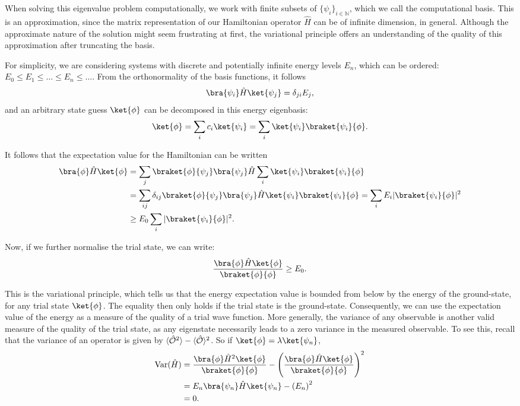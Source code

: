 When solving this eigenvalue problem computationally, we work with finite subsets of $\{\psi_i\}_{i\in \mathbb{N}}$, which we call the computational basis. This is an approximation, since the matrix representation of our Hamiltonian operator $\hat{H}$ can be of infinite dimension, in general. Although the approximate nature of the solution might seem frustrating at first, the variational principle offers an understanding of the quality of this approximation after truncating the basis.

For simplicity, we are considering systems with discrete and potentially infinite energy levels $E_n$, which can be ordered: $E_0 \leq E_1 \leq \dots \leq E_n \leq \dots$. From the orthonormality of the basis functions, it follows 
\begin{align*}
    \bra{\psi_i} \hat{H} \ket{\psi_j} = \delta_{ji} E_j,
\end{align*}
and an arbitrary state guess $\ket{\phi}$ can be decomposed in this energy eigenbasis:
\begin{align*}
    \ket{\phi} = \sum_i c_i\ket{\psi_i}= \sum_i  \ket{\psi_i}\braket{\psi_i}{\phi}. 
\end{align*}

It follows that the expectation value for the Hamiltonian can be written
\begin{align*}
    \bra{\phi} \hat{H}\ket{\phi} &=\sum_j  \braket{\phi}{\psi_j}\bra{\psi_j}  \hat{H}\sum_i  \ket{\psi_i}\braket{\psi_i}{\phi}\\
    &=\sum_{ij}\delta_{ij}\braket{\phi}{\psi_j}\bra{\psi_j}  \hat{H} \ket{\psi_i}\braket{\psi_i}{\phi} = \sum_i E_i \vert \braket{\psi_i}{\phi} \vert ^2\\
    &\geq E_0\sum_i \vert \braket{\psi_i}{\phi} \vert ^2.
\end{align*}

Now, if we further normalise the trial state, we can write:
\begin{align*}
    \frac{\bra{\phi} \hat{H}\ket{\phi}}{\braket{\phi}{\phi}} \geq E_0.
\end{align*}

This is the variational principle, which tells us that the energy expectation value is bounded from below by the energy of the ground-state, for any trial state $\ket{\phi}$. The equality then only holds if the trial state is the ground-state. Consequently, we can use the expectation value of the energy as a measure of the quality of a trial wave function. More generally, the variance of any observable is another valid measure of the quality of the trial state, as any eigenstate necessarily leads to a zero variance in the measured observable. To see this, recall that the variance of an operator is given by $\langle \hat{\mathcal{O}}^2 \rangle-\langle \hat{\mathcal{O}} \rangle^2$. So if $\ket{\phi} = \lambda \ket{\psi_n}$,
\begin{align*}
\text{Var}(\hat{H}) &= \frac{\bra{\phi} \hat{H}^2 \ket{\phi}}{\braket{\phi}{\phi}} - \left(\frac{\bra{\phi} \hat{H} \ket{\phi}}{\braket{\phi}{\phi}}\right)^2 \\
&= E_n \bra{\psi_n} \hat{H} \ket{\psi_n} - \left( E_n\right)^2 \\
&= 0.
\end{align*}

